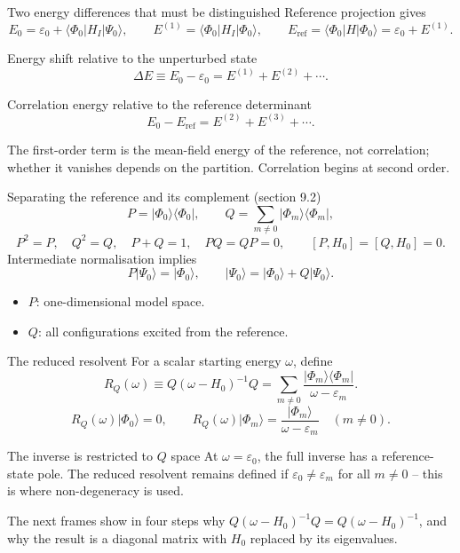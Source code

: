 \documentclass[aspectratio=169,10pt]{beamer}
\newcommand{\ket}[1]{\vert #1\rangle}
\newcommand{\bra}[1]{\langle #1\vert}
\newcommand{\mel}[3]{\langle #1\lvert #2\rvert #3\rangle}
\newcommand{\Eref}{E_{\mathrm{ref}}}
\newcommand{\ph}{\Phi_0}
\newcommand{\Psizero}{\Psi_0}
\begin{document}
\begin{frame}{Two energy differences that must be distinguished}
Reference projection gives
\[
E_0=\varepsilon_0+\mel{\ph}{H_I}{\Psizero},\qquad
E^{(1)}=\mel{\ph}{H_I}{\ph},
\qquad
\Eref=\mel{\ph}{H}{\ph}=\varepsilon_0+E^{(1)}.
\]
\begin{block}{Energy shift relative to the unperturbed state}
\[\Delta E\equiv E_0-\varepsilon_0=E^{(1)}+E^{(2)}+\cdots.\]
\end{block}
\begin{exampleblock}{Correlation energy relative to the reference determinant}
\[E_0-\Eref=E^{(2)}+E^{(3)}+\cdots.\]
\end{exampleblock}
\small The first-order term is the mean-field energy of the reference, not correlation; whether it vanishes depends on the partition. Correlation begins at second order.
\end{frame}

\begin{frame}{Separating the reference and its complement (section 9.2)}
\[
P=\ket{\ph}\bra{\ph},\qquad
Q=\sum_{m\ne0}\ket{\Phi_m}\bra{\Phi_m},
\]
\[
P^2=P,\quad Q^2=Q,\quad P+Q=1,\quad PQ=QP=0,
\qquad
[P,H_0]=[Q,H_0]=0.
\]
Intermediate normalisation implies
\[
P\ket{\Psizero}=\ket{\ph},\qquad
\boxed{\ket{\Psizero}=\ket{\ph}+Q\ket{\Psizero}.}
\]
\begin{itemize}
\item \(P\): one-dimensional model space.
\item \(Q\): all configurations excited from the reference.
\end{itemize}
\end{frame}

\begin{frame}{The reduced resolvent}
For a scalar starting energy \(\omega\), define
\[
\boxed{R_Q(\omega)\equiv Q(\omega-H_0)^{-1}Q
=\sum_{m\ne0}\frac{\ket{\Phi_m}\bra{\Phi_m}}
 {\omega-\varepsilon_m}.}
\]
\[
R_Q(\omega)\ket{\ph}=0,\qquad
R_Q(\omega)\ket{\Phi_m}=
\frac{\ket{\Phi_m}}{\omega-\varepsilon_m}\quad(m\ne0).
\]
\begin{block}{The inverse is restricted to \(Q\) space}
At \(\omega=\varepsilon_0\), the full inverse has a reference-state pole. The reduced resolvent remains defined if \(\varepsilon_0\ne\varepsilon_m\) for all \(m\ne0\) -- this is where non-degeneracy is used.
\end{block}
\small The next frames show in four steps why \(Q(\omega-H_0)^{-1}Q=Q(\omega-H_0)^{-1}\), and why the result is a diagonal matrix with \(H_0\) replaced by its eigenvalues.
\end{frame}
\end{document}
